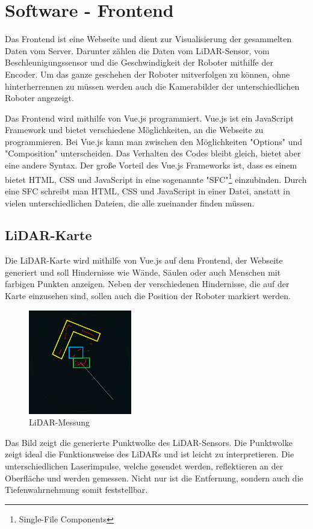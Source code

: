 
\section{Software - Frontend}
\label{sec:software_frontend}
Das Frontend ist eine Webseite und dient zur Visualisierung der gesammelten Daten vom Server.
Darunter zählen die Daten vom LiDAR-Sensor, vom Beschleunigungssensor und die Geschwindigkeit der Roboter
mithilfe der Encoder. Um das ganze geschehen der Roboter mitverfolgen zu können, ohne hinterherrennen zu müssen
werden auch die Kamerabilder der unterschiedlichen Roboter angezeigt.

Das Frontend wird mithilfe von Vue.js programmiert. Vue.js ist ein JavaScript Framework und bietet 
verschiedene Möglichkeiten, an die Webseite zu programmieren. Bei Vue.js kann man zwischen den Möglichkeiten "Options" und "Composition" unterscheiden.
Das Verhalten des Codes bleibt gleich, bietet aber eine andere Syntax. Der große Vorteil des Vue.js Frameworks ist, dass es einem bietet 
HTML, CSS und JavaScript in eine sogenannte "SFC"\footnote{Single-File Components} einzubinden. Durch eine SFC schreibt man HTML, CSS und JavaScript in einer Datei, anstatt in vielen unterschiedlichen
Dateien, die alle zueinander finden müssen.  

\subsection{LiDAR-Karte}
\label{subsec:frontend_lidar_map}
Die LiDAR-Karte wird mithilfe von Vue.js auf dem Frontend, der Webseite generiert und soll Hindernisse wie Wände, Säulen oder auch Menschen mit farbigen Punkten anzeigen. 
Neben der verschiedenen Hindernisse, die auf der Karte einzusehen sind, sollen auch die Position der Roboter markiert werden. 
\begin{figure}[H]
    \includegraphics[width=0.4\textwidth, center]{img/LiDARMessungZeichnung_alt.png}
    \caption{LiDAR-Messung}
    \label{fig:LiDAR-Messung}
\end{figure}
Das Bild zeigt die generierte Punktwolke des LiDAR-Sensors. Die Punktwolke zeigt ideal die Funktionsweise des LiDARs und ist leicht zu interpretieren. 
Die unterschiedlichen Laserimpulse, welche gesendet werden, reflektieren an der Oberfläche und werden gemessen. Nicht nur ist die Entfernung, sondern auch die Tiefenwahrnehmung somit feststellbar.


